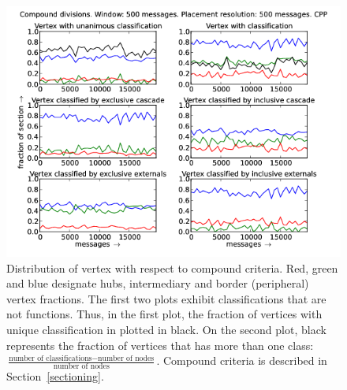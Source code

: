 \documentclass[%
 aip,
 jmp,%
 amsmath,amssymb,
 reprint,%
]{revtex4-1}
\begin{document}
\begin{figure}[hbtp] 
   \centering
        \includegraphics[width=\textwidth]{figs/CPP/500_2}
    \caption{Distribution of vertex with respect to compound criteria. Red, green and blue designate hubs, intermediary and border (peripheral) vertex fractions. The first two plots exhibit classifications that are not functions. Thus, in the first plot, the fraction of vertices with unique classification in plotted in black. On the second plot, black represents the fraction of vertices that has more than one class: $\frac{\text{number of classifications} - \text{number of nodes}}{\text{number of nodes}}$. Compound criteria is described in Section~\ref{sectioning}.}
    \label{fig:cpp500_}
\end{figure}
\end{document}
